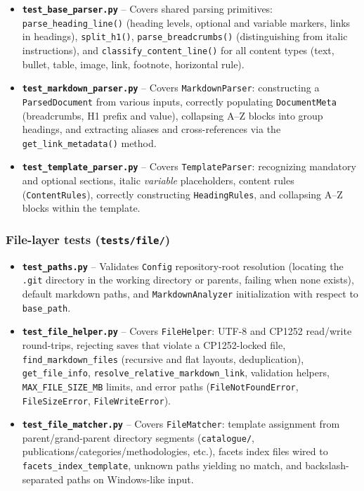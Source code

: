 \documentclass[12pt, a4paper]{article}
\begin{document}
\begin{itemize}
    \item \textbf{\texttt{test\_base\_parser.py}} -- Covers shared parsing primitives: \texttt{parse\_heading\_line()} 
    (heading levels, optional and variable markers, links in headings), \texttt{split\_h1()}, \texttt{parse\allowbreak\_breadcrumbs()} 
    (distinguishing from italic instructions), and \texttt{classify\_content\_line()} for all content types (text, bullet, 
    table, image, link, footnote, horizontal rule).
    \item \textbf{\texttt{test\_markdown\_parser.py}} -- Covers \texttt{MarkdownParser}: constructing a 
    \texttt{ParsedDocument} from various inputs, correctly populating \texttt{DocumentMeta} (breadcrumbs, 
    H1 prefix and value), collapsing A--Z blocks into group headings, and extracting aliases and 
    cross-references via the \texttt{get\_link\_metadata()} method.
    \item \textbf{\texttt{test\_template\_parser.py}} -- Covers \texttt{TemplateParser}: 
    recognizing mandatory and optional sections, italic \emph{variable} placeholders, 
    content rules (\texttt{ContentRules}), correctly constructing \texttt{HeadingRules}, 
    and collapsing A--Z blocks within the template.
\end{itemize}

\subsubsection*{File-layer tests (\texttt{tests/file/})}

\begin{itemize}
    \item \textbf{\texttt{test\_paths.py}} --
    Validates \texttt{Config} repository-root resolution (locating the \texttt{.git} directory in the working 
    directory or parents, failing when none exists), default markdown paths, and \texttt{MarkdownAnalyzer} initialization 
    with respect to \texttt{base\_path}.

    \item \textbf{\texttt{test\_file\_helper.py}} --
    Covers \texttt{FileHelper}: UTF-8 and CP1252 read/write round-trips, rejecting saves that violate a CP1252-locked file,
    \texttt{find\_markdown\_files} (recursive and flat layouts, deduplication),
    \texttt{get\_file\_info}, \texttt{resolve\_relative\_markdown\_link}, validation helpers,
    \texttt{MAX\_FILE\_SIZE\_MB} limits, and error paths (\texttt{FileNotFoundError}, \texttt{FileSizeError}, \texttt{FileWriteError}).

    \item \textbf{\texttt{test\_file\_matcher.py}} --
    Covers \texttt{FileMatcher}: template assignment from parent/grand-parent directory segments (\texttt{catalogue/}, 
    publications/categories/methodologies, etc.), facets index files wired to 
    \texttt{facets\_index\_template}, unknown paths yielding no match, and backslash-separated paths on Windows-like input.
\end{itemize}
\end{document}
